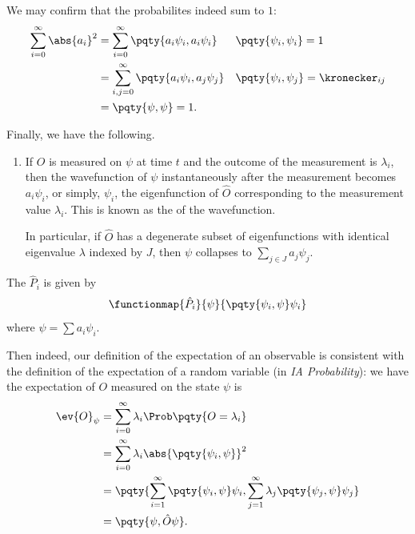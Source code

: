 We may confirm that the probabilites indeed sum to \(1\):
\begin{subequations}
    \begin{align}
        \sum_{i = 0}^{\infty} \abs{a_i}^2 &= \sum_{i = 0}^{\infty} \pqty{a_i \psi_i, a_i \psi_i} && \pqty{\psi_i, \psi_i} = 1 \\
        &= \sum_{i, j = 0}^{\infty} \pqty{a_i \psi_i, a_j \psi_j} && \pqty{\psi_i, \psi_j} = \kronecker_{ij} \\
        &= \pqty{\psi, \psi} = 1.
    \end{align}
\end{subequations}

Finally, we have the following.

\begin{enumerate}[resume]
    \item {} If \(O\) is measured on \(\psi\) at time \(t\) and the outcome of the measurement is \(\lambda_i\), then the wavefunction of \(\psi\) instantaneously after the measurement becomes \(a_i \psi_i\), or simply, \(\psi_i\), the eigenfunction of \(\hat{O}\) corresponding to the measurement value \(\lambda_i\). This is known as the  of the wavefunction.

    In particular, if \(\hat{O}\) has a degenerate subset of eigenfunctions with identical eigenvalue \(\lambda\) indexed by \(J\), then \(\psi\) collapses to \(\sum_{j \in J} a_j \psi_j\).
\end{enumerate}

\begin{definition}
    The  \(\hat{P}_i\) is given by
    \begin{equation}
        \functionmap{\hat{P}_i}{\psi}{\pqty{\psi_i, \psi} \psi_i}
    \end{equation}
    where \(\psi = \sum a_i \psi_i\).
\end{definition}

Then indeed, our definition of the expectation of an observable is consistent with the definition of the expectation of a random variable (in \textit{IA Probability}): we have the expectation of \(O\) measured on the state \(\psi\) is
\begin{subequations}
    \begin{align}
        \ev{O}_{\psi} &= \sum_{i = 0}^{\infty} \lambda_i \Prob\pqty{O = \lambda_i} \\
        &= \sum_{i = 0}^{\infty} \lambda_i \abs{\pqty{\psi_i, \psi}}^2 \\
        &= \pqty{\sum_{i = 1}^{\infty} \pqty{\psi_i, \psi} \psi_i, \sum_{j = 1}^{\infty} \lambda_j \pqty{\psi_j, \psi} \psi_j} \\
        &= \pqty{\psi, \hat{O} \psi}.
    \end{align}
\end{subequations}

